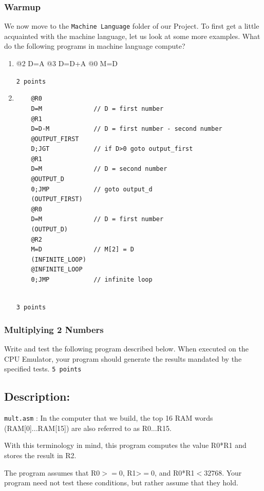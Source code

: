 \documentclass[11pt]{article}
\begin{document}
\subsubsection{Warmup}
We now move to the \texttt{Machine Language} folder of our Project. To first get a little acquainted with the machine language, let us look at some more examples. What do the following programs in machine language compute?
\begin{enumerate}
	\item \begin{verbatim*}
		@2
		D=A 
		@3
		D=D+A 
		@0
		M=D 
	\end{verbatim*} \hspace*{\fill} \texttt{\small  2 points}
\item \begin{verbatim}
	@R0
	D=M              // D = first number
	@R1
	D=D-M            // D = first number - second number
	@OUTPUT_FIRST
	D;JGT            // if D>0 goto output_first
	@R1
	D=M              // D = second number
	@OUTPUT_D
	0;JMP            // goto output_d
	(OUTPUT_FIRST)
	@R0             
	D=M              // D = first number
	(OUTPUT_D)
	@R2
	M=D              // M[2] = D 
	(INFINITE_LOOP)
	@INFINITE_LOOP
	0;JMP            // infinite loop
	
\end{verbatim} \hspace*{\fill} \texttt{\small  3 points}
\end{enumerate}

\subsubsection{Multiplying 2 Numbers}
Write and test the following program described below. When executed on the CPU Emulator, your
program should generate the results mandated by the specified tests. \hspace*{\fill} \texttt{\small  5 points}

\subsection*{Description:}  

\texttt{mult.asm} : In the computer that we build, the top 16 RAM words (RAM[0]...RAM[15]) are also referred to as R0...R15. 

With this terminology in mind, this program computes the value R0*R1 and stores the result in R2.

The program assumes that R0$>=0$, R1>$=0$, and R0*R1$<32768$. Your program need not test these conditions, but rather assume that they hold.
\end{document}
